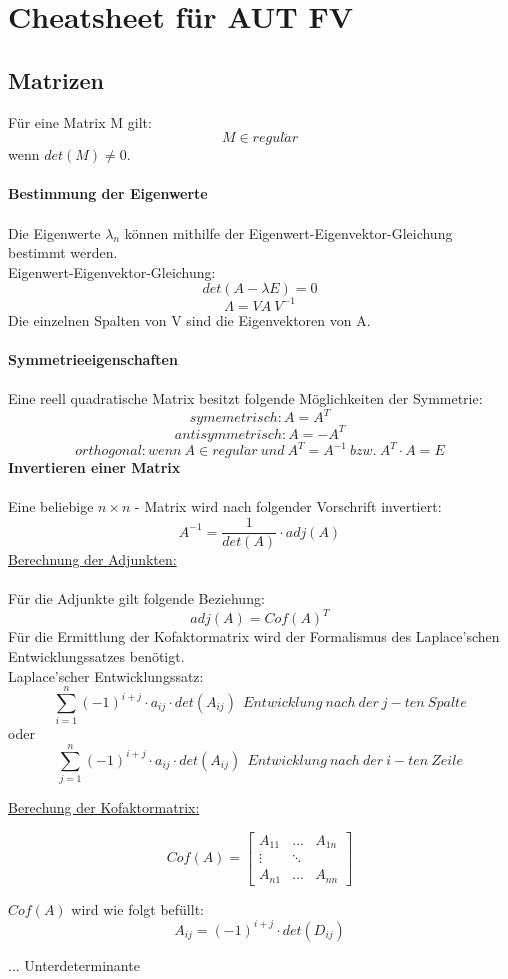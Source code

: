 \documentclass[12pt]{article}
\begin{document}
\section{Cheatsheet für AUT FV}
\subsection{Matrizen}
Für eine Matrix M gilt:
\[ M \in regul\ddot{a}r\] 
wenn $ det(M) \neq 0 $. \\ \\
\textbf{Bestimmung der Eigenwerte} \\ \\
Die Eigenwerte $ \lambda_{n} $ können mithilfe der Eigenwert-Eigenvektor-Gleichung bestimmt werden. \\
Eigenwert-Eigenvektor-Gleichung:
\[ det(A - \lambda E) = 0 \]
\[ \Lambda = VA \ V^{-1} \] 
Die einzelnen Spalten von V sind die Eigenvektoren von A. \\ \\
\textbf{Symmetrieeigenschaften}\\ \\
Eine reell quadratische Matrix besitzt folgende Möglichkeiten der Symmetrie:\\
\[ symemetrisch: A = A^{T}\]
\[ antisymmetrisch: A = -A^{T} \]
\[ orthogonal: wenn \ A \in regul\ddot{a}r \ und \ A^{T} = A^{-1} \ bzw.\  A^{T} \cdot A = E \]
\textbf{Invertieren einer Matrix} \\ \\
Eine beliebige $ n \times n $ - Matrix wird nach folgender Vorschrift invertiert: \\
\[ A^{-1} = \frac{1}{det(A)} \cdot adj(A) \]
\underline{Berechnung der Adjunkten:} \\ \\
Für die Adjunkte gilt folgende Beziehung:
\[ adj(A) = Cof(A)^{T} \]
Für die Ermittlung der Kofaktormatrix wird der Formalismus des Laplace'schen Entwicklungssatzes benötigt. \\
Laplace'scher Entwicklungssatz:
\[ \sum_{i=1}^{n}(-1)^{i+j} \cdot a_{ij} \cdot det(A_{ij}) \ \ Entwicklung \ nach \ der \ j-ten \ Spalte\]
oder
\[ \sum_{j=1}^{n}(-1)^{i+j} \cdot a_{ij} \cdot det(A_{ij}) \ \ Entwicklung \ nach \ der \ i-ten \ Zeile\]

\underline{Berechung der Kofaktormatrix:}

\[Cof(A)=
\begin{bmatrix}
   A_{11}&...&A_{1n}\\
   \vdots & \ddots&\\
   A_{n1}&...&A_{nn}
\end{bmatrix}
\]

\(Cof(A)\) wird wie folgt befüllt:
\[A_{ij}=(-1)^{i+j} \cdot det(D_{ij})\] 

\begin{flushright}
\vspace{-0.9cm}  ... Unterdeterminante
\end{flushright}
\end{document}
